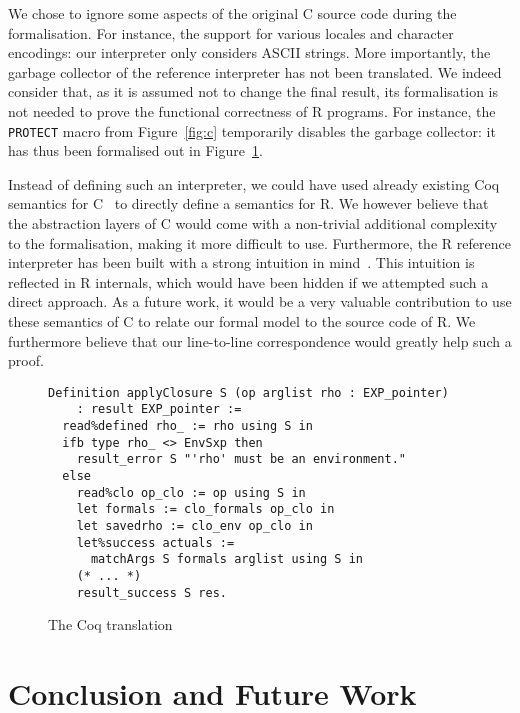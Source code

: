 \documentclass[9pt, sigplan, natbib=false, screen=true]{acmart}
\newcommand\Coq{Coq}
\newcommand\R{R}
\newcommand\Cn{C}
\begin{document}
We chose to ignore some aspects of the original \Cn{} source code
during the formalisation.
For instance, the support for various locales and character encodings:
our interpreter only considers ASCII strings.
More importantly, the garbage collector of the reference interpreter
has not been translated.
We indeed consider that, as it is assumed not to change the final result,
its formalisation is not needed to prove the functional correctness
of \R{} programs.
For instance,
the \texttt{PROTECT} macro from Figure~\ref{fig:c}
temporarily disables the garbage collector:
it has thus been formalised out in Figure~\ref{fig:coq}.

Instead of defining such an interpreter,
we could have used already existing \Coq{} semantics
for \Cn{}~\parencite{formalin, Leroy-Compcert-CACM}
to directly define a semantics for \R{}.
We however believe that the abstraction layers of \Cn{}
would come with a non-trivial additional complexity to the formalisation,
making it more difficult to use.
Furthermore, the \R{} reference interpreter has been built
with a strong intuition in mind~\parencite{ihaka1996r}.
This intuition is reflected in \R{} internals,
which would have been hidden if we attempted such a direct approach.
%
As a future work, it would be a very valuable contribution
to use these semantics of \Cn{} to relate
our formal model to the source code of \R{}.
We furthermore believe that our line-to-line correspondence
would greatly help such a proof.

\begin{figure}
\begin{verbatim}
Definition applyClosure S (op arglist rho : EXP_pointer)
    : result EXP_pointer :=
  read%defined rho_ := rho using S in
  ifb type rho_ <> EnvSxp then
    result_error S "'rho' must be an environment."
  else
    read%clo op_clo := op using S in
    let formals := clo_formals op_clo in
    let savedrho := clo_env op_clo in
    let%success actuals :=
      matchArgs S formals arglist using S in
    (* ... *)
    result_success S res.
\end{verbatim}
    \caption{The \Coq{} translation}
    \label{fig:coq}
\end{figure}


\section{Conclusion and Future Work}
\label{sec:conclusion}
\end{document}
